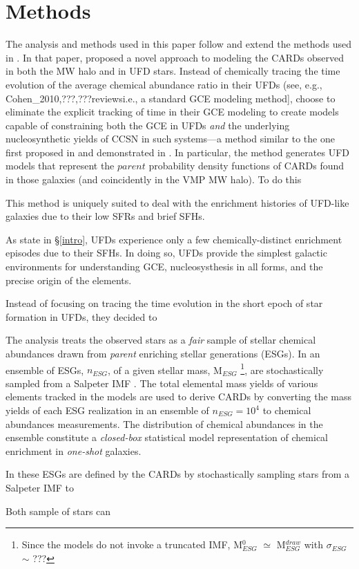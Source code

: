\section{Methods}
\label{methods}

The analysis and methods used in this paper follow and extend the methods used in \citet{Lee_2013}. In that paper, \citet{Lee_2013} proposed a novel approach to modeling the CARDs observed in both the MW halo and in UFD stars. Instead of chemically tracing the time evolution of the average chemical abundance ratio in their UFDs (see, e.g., {Cohen_2010,???,???reviews}i.e., a standard GCE modeling method], \citet{Lee_2013} choose to eliminate the explicit tracking of time in their GCE modeling to create models capable of constraining both the GCE in UFDs {\it and} the underlying nucleosynthetic yields of CCSN in such systems---a method similar to the one first proposed in \citet{Karlsson2005a} and demonstrated in \citet{Karlsson_2005b}. In particular, the method generates UFD models that represent the $parent$ probability density functions of CARDs found in those galaxies (and coincidently in the VMP MW halo). To do this

This method is uniquely suited to deal with the enrichment histories of UFD-like galaxies due to their low SFRs and brief SFHs. 

As state in \S\ref{intro}, UFDs experience only a few chemically-distinct enrichment episodes due to their SFHs. In doing so, UFDs provide the simplest galactic environments for understanding GCE, nucleosysthesis in all forms, and the precise origin of the elements. 


Instead of focusing on tracing the time evolution in the short epoch of star formation in UFDs, they decided to 



The analysis treats the observed stars as a {\it fair} sample of stellar chemical abundances drawn from {\it parent} enriching stellar generations (ESGs). In \citet{Lee_2013} an ensemble of ESGs, $n_{ESG}$, of a given stellar mass, M$_{ESG}$
\footnote{Since the models do not invoke a truncated IMF, M$_{ESG}^0$ $\simeq$ M$_{ESG}^{draw}$ with $\sigma_{ESG}$ $\sim$ ???}, 
are stochastically sampled from a Salpeter IMF \citep{Salpeter_1955}. The total elemental mass yields of various elements tracked in the models are used to derive CARDs by converting the mass yields of each ESG realization in an ensemble of $n_{ESG} = 10^4$ to chemical abundances measurements. The distribution of chemical abundances in the ensemble constitute a {\it closed-box} statistical model representation of chemical enrichment in {\it one-shot} galaxies. 


In \citet{Lee_2013} these ESGs are defined by the CARDs by stochastically sampling stars from a Salpeter IMF \citep{Salpeter_1955} to    

Both sample of stars can 